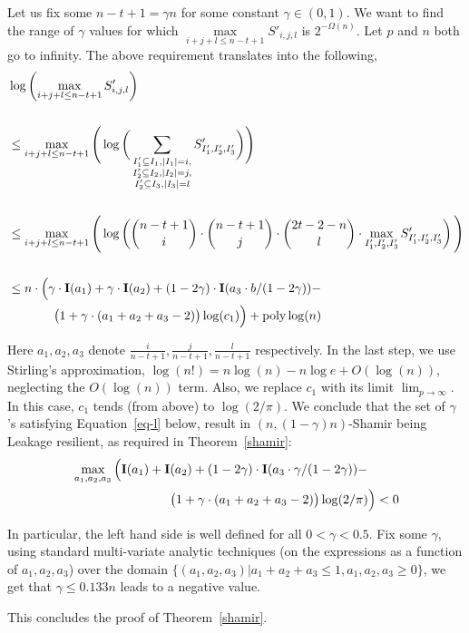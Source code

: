 Let us fix some $n-t+1=\gamma n$ for some constant $\gamma\in (0,1)$. We want to find the range of $\gamma$ values for which $\max\limits_{i+j+l\leq n-t+1}S'_{i,j,l}$ is $2^{-\Omega(n)}$.
Let $p$ and $n$ both go to infinity. The above requirement translates into the following,
\begin{align}
&\log \left(\max_{i+j+l\leq n-t+1}S'_{i,j,l} \right) \nonumber\\ \nonumber \\ 
&\leq \max_{i+j+l\leq n-t+1} \Bigg(\log \bigg(\sum_{\substack{
I'_1\subseteq I_1,|I_1|=i,\\
I'_2\subseteq I_2,|I_2|=j,\\
I'_3\subseteq I_3,|I_3|=l}}S'_{I'_1,I'_2,I'_3} \bigg) \Bigg) \nonumber\\ \nonumber\\
&\leq \max_{i+j+l\leq n-t+1} \Bigg(\log \left(\binom{n-t+1}{i} \cdot \binom{n-t+1}{j} \cdot \binom{2t - 2 - n}{l} \cdot \max_{I'_1,I'_2,I'_3}S'_{I'_1,I'_2,I'_3} \right) \Bigg)\label{eq-15}\\ \nonumber \\
&\leq n\cdot \Big(\gamma \cdot \Ent{a_1} + \gamma\cdot \Ent{a_2} + (1-2\gamma)\cdot \Ent{a_3\cdot b/(1-2\gamma)}- \nonumber \\
& \hphantom{{}=n\cdot \big(\gamma} \big(1 + \gamma\cdot(a_1 + a_2 + a_3 - 2)\big)\log(c_1) \Big)+\mathrm{poly}\log(n)
\end{align} 

Here $a_1,a_2,a_3$ denote
$\frac{i}{n-t+1},\frac{j}{n-t+1},\frac{l}{n-t+1}$ respectively. 
In the last step, we use Stirling's approximation, $\log(n!)=n\log(n) - n \log e+ O(\log(n))$, neglecting the $O(\log(n))$ term. Also, we replace $c_1$ with its limit $\lim_{p\rightarrow \infty}$. In this case, $c_1$ tends (from above) to $\log(2/\pi)$. %
We conclude that the set of $\gamma$'s satisfying Equation~\ref{eq-l} below, result in $(n,(1-\gamma)n)$-Shamir being Leakage resilient, as required in Theorem~\ref{shamir}:%
\begin{align}
&\max_{a_1,a_2,a_3} \Big(\Ent{a_1}+\Ent{a_2}+(1-2\gamma)\cdot \Ent{a_3\cdot \gamma/(1-2\gamma)}- \label{eq-l} \\
&\hphantom{{}=n\cdot \big(\Ent{a_1}+\Ent{}} \big(1 + \gamma\cdot(a_1 + a_2 + a_3 - 2)\big)\log(2/\pi) \Big) < 0 \nonumber
\end{align} 

In particular, the left hand side is well defined for all $0<\gamma<0.5$.
Fix some $\gamma$, using standard multi-variate analytic techniques (on the expressions as a function of $a_1,a_2,a_3$) over the domain $\{(a_1,a_2,a_3)|a_1+a_2+a_3\leq 1,a_1,a_2,a_3\geq 0\}$, we get that $\gamma\leq 0.133n$ leads to a negative value.

\noindent This concludes the proof of Theorem~\ref{shamir}.